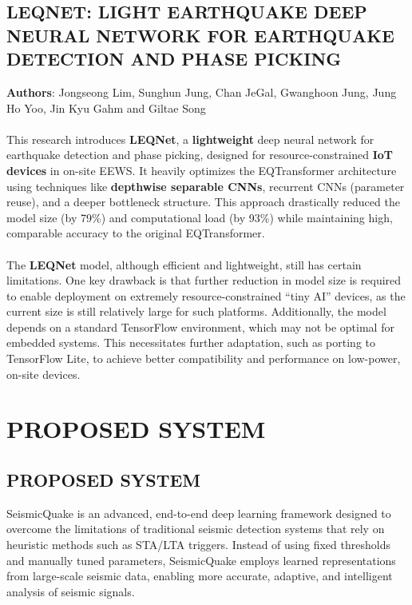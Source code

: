 \documentclass[a4paper,12pt]{report}
\begin{document}
\section{LEQNET: LIGHT EARTHQUAKE DEEP NEURAL NETWORK FOR EARTHQUAKE DETECTION AND PHASE PICKING}
\label{sec:2.15} %
\textbf{Authors}: Jongseong Lim, Sunghun Jung, Chan JeGal, Gwanghoon Jung, Jung Ho Yoo, Jin Kyu Gahm and Giltae Song\\
\\
This research introduces \textbf{LEQNet}, a \textbf{lightweight} deep neural network for earthquake detection and phase picking, designed for resource-constrained \textbf{IoT devices} in on-site EEWS. It heavily optimizes the EQTransformer architecture using techniques like \textbf{depthwise separable CNNs}, recurrent CNNs (parameter reuse), and a deeper bottleneck structure. This approach drastically reduced the model size (by 79\%) and computational load (by 93\%) while maintaining high, comparable accuracy to the original EQTransformer.
\\
\\
The \textbf{LEQNet} model, although efficient and lightweight, still has certain limitations. One key drawback is that further reduction in model size is required to enable deployment on extremely resource-constrained “tiny AI” devices, as the current size is still relatively large for such platforms. Additionally, the model depends on a standard TensorFlow environment, which may not be optimal for embedded systems. This necessitates further adaptation, such as porting to TensorFlow Lite, to achieve better compatibility and performance on low-power, on-site devices.

\newpage
\endgroup
\chapter{PROPOSED SYSTEM}
\label{chap:proposed_work}

\section{PROPOSED SYSTEM}
\label{sec:proposed_system}

SeismicQuake is an advanced, end-to-end deep learning framework designed to overcome the limitations of traditional seismic detection systems that rely on heuristic methods such as STA/LTA triggers. Instead of using fixed thresholds and manually tuned parameters, SeismicQuake employs learned representations from large-scale seismic data, enabling more accurate, adaptive, and intelligent analysis of seismic signals.
\end{document}
